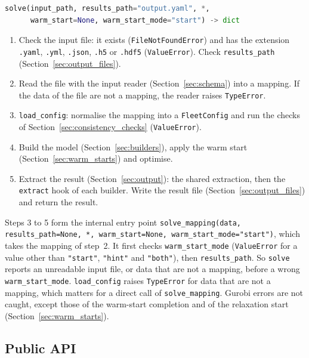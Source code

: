 \begin{lstlisting}[language=Python]
solve(input_path, results_path="output.yaml", *,
      warm_start=None, warm_start_mode="start") -> dict
\end{lstlisting}
\begin{enumerate}[nosep,label=\arabic*.]
  \item Check the input file: it exists (\texttt{FileNotFoundError}) and has the extension \texttt{.yaml}, \texttt{.yml}, \texttt{.json}, \texttt{.h5} or \texttt{.hdf5} (\texttt{ValueError}). Check \texttt{results\_path} (Section~\ref{sec:output_files}).
  \item Read the file with the input reader (Section~\ref{sec:schema}) into a mapping. If the data of the file are not a mapping, the reader raises \texttt{TypeError}.
  \item \texttt{load\_config}: normalise the mapping into a \texttt{FleetConfig} and run the checks of Section~\ref{sec:consistency_checks} (\texttt{ValueError}).
  \item Build the model (Section~\ref{sec:builders}), apply the warm start (Section~\ref{sec:warm_starts}) and optimise.
  \item Extract the result (Section~\ref{sec:output}): the shared extraction, then the \texttt{extract} hook of each builder. Write the result file (Section~\ref{sec:output_files}) and return the result.
\end{enumerate}
Steps 3 to 5 form the internal entry point \texttt{solve\_mapping(data, results\_path=None, *, warm\_start=None, warm\_start\_mode="start")}, which takes the mapping of step~2. It first checks \texttt{warm\_start\_mode} (\texttt{ValueError} for a value other than \texttt{"start"}, \texttt{"hint"} and \texttt{"both"}), then \texttt{results\_path}. So \texttt{solve} reports an unreadable input file, or data that are not a mapping, before a wrong \texttt{warm\_start\_mode}. \texttt{load\_config} raises \texttt{TypeError} for data that are not a mapping, which matters for a direct call of \texttt{solve\_mapping}. Gurobi errors are not caught, except those of the warm-start completion and of the relaxation start (Section~\ref{sec:warm_starts}).

\subsection{Public API}
\label{sec:api}

